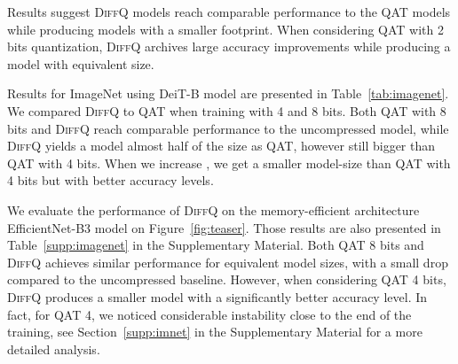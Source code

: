\documentclass{article}
\newcommand{\diffq}{\textsc{DiffQ}\xspace}
\begin{document}
Results suggest \diffq models reach comparable performance to the QAT models while producing models with a smaller footprint. When considering QAT with 2 bits quantization, \diffq{} archives large accuracy improvements while producing a model with equivalent size.


Results for ImageNet using DeiT-B model are presented in Table~\ref{tab:imagenet}. We compared \diffq to QAT when training with 4 and 8 bits. Both QAT with 8 bits and \diffq reach comparable performance to the uncompressed model, while \diffq yields a model almost half of the size as QAT, however still bigger than QAT with 4 bits. When we increase , we get a smaller model-size than QAT with 4 bits but with better accuracy levels.

We evaluate the performance of \diffq{} on the memory-efficient architecture EfficientNet-B3 model on Figure~\ref{fig:teaser}.
Those results are also presented in Table~\ref{supp:imagenet} in the Supplementary Material.
Both QAT 8 bits and \diffq{} achieves similar performance
for equivalent model sizes, with a small drop compared to the uncompressed
baseline. However, when considering QAT 4 bits, \diffq{} produces a smaller
model with a significantly better accuracy level. In fact, for QAT 4, we
noticed considerable instability close to the end of the training, see Section~\ref{supp:imnet} in the Supplementary Material for a more detailed analysis.
\end{document}
